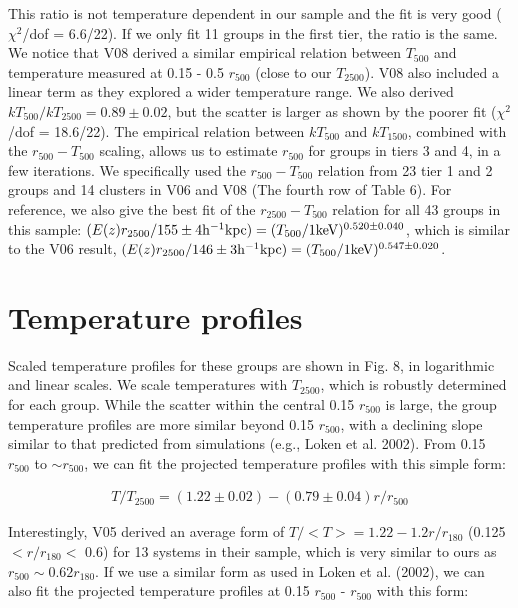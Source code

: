 \documentclass{aastex}
\begin{document}
This ratio is not temperature dependent in our sample and the fit is very
good ($\chi^{2}$/dof = 6.6/22). If we only fit 11 groups in the first tier,
the ratio is the same. We notice that V08 derived a similar empirical
relation between $T_{500}$ and temperature measured at 0.15 - 0.5 $r_{500}$ (close
to our $T_{2500}$). V08 also included a linear term as they explored a wider
temperature range. We also derived $kT_{500} / kT_{2500} = 0.89 \pm 0.02$,
but the scatter is larger as shown by the poorer fit ($\chi^{2}$/dof = 18.6/22).
The empirical relation between $kT_{500}$ and $kT_{1500}$, combined with the
$r_{500} - T_{500}$ scaling, allows us to estimate $r_{500}$ for groups in tiers 3
and 4, in a few iterations. We specifically used the $r_{500} - T_{500}$ relation
from 23 tier 1 and 2 groups and 14 clusters in V06 and V08 (The fourth row of Table 6). 
For reference, we also give the best fit of the $r_{2500} - T_{500}$ relation
for all 43 groups in this sample:
$(E(z) r_{2500} / {\rm 155\pm4 h^{-1} kpc}) = (T_{500} / \rm 1 keV)^{0.520\pm0.040}$,
which is similar to the V06 result,
$(E(z) r_{2500} / {\rm 146\pm3 h^{-1} kpc}) = (T_{500} / \rm 1 keV)^{0.547\pm0.020}$.

\section{Temperature profiles}

Scaled temperature profiles for these groups are shown in Fig. 8, in logarithmic
and linear scales. We scale temperatures with $T_{2500}$, which is robustly
determined for each group. While the scatter within the central 0.15 $r_{500}$
is large, the group temperature profiles are more similar beyond 0.15 $r_{500}$,
with a declining slope similar to that predicted from simulations (e.g., Loken et al. 2002).
From 0.15 $r_{500}$ to $\sim r_{500}$, we can fit the projected temperature profiles
with this simple form:

\begin{eqnarray}
T/T_{2500} = (1.22\pm0.02) - (0.79\pm0.04) r/r_{500} 
\end{eqnarray}

Interestingly, V05 derived an average form of $T/<T> = 1.22 - 1.2 r/r_{180}$
(0.125 $< r/r_{180} <$ 0.6) for 13 systems in their sample, which is very similar
to ours as $r_{500} \sim 0.62 r_{180}$.
If we use a similar form as used in Loken et al. (2002), we can also fit the
projected temperature profiles at 0.15 $r_{500}$ - $r_{500}$ with this form:
\end{document}
